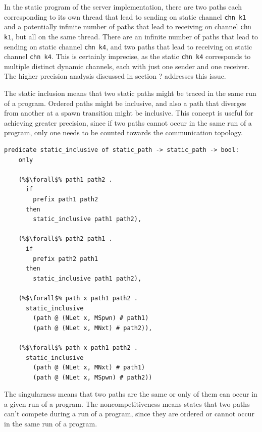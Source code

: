 \documentclass{article}
\begin{document}
In the static program of the server implementation, there are two paths each corresponding to its
own thread that lead
to sending on
static channel \lstinline[language=sugar_lang]{chn k1} and a potentially infinite number of
paths that lead to receiving on
channel \lstinline[language=sugar_lang]{chn k1}, but all on the same thread.
There are an infinite number of paths that lead
to sending on static channel \lstinline[language=sugar_lang]{chn k4}, and two paths
that lead to receiving on static channel
\lstinline[language=sugar_lang]{chn k4}. This is certainly imprecise,
as the static \lstinline[language=sugar_lang]{chn k4} corresponds to
multiple distinct dynamic channels, each with just one sender and one receiver.  The higher
precision analysis discussed in section ? addresses this issue.


The static inclusion means that two static paths might be traced in
the same run of a program. Ordered paths might be inclusive, and also a path that diverges
from another at a spawn transition might be inclusive. This concept is useful for achieving
greater precision, since if two paths cannot occur in the same run of a program, only one needs
to be counted towards the communication topology. 

\begin{lstlisting}[language=logic, escapechar=\%]
  predicate static_inclusive of static_path -> static_path -> bool:
    only

    (%$\forall$% path1 path2 .
      if
        prefix path1 path2
      then
        static_inclusive path1 path2),

    (%$\forall$% path2 path1 .
      if
        prefix path2 path1
      then
        static_inclusive path1 path2),

    (%$\forall$% path x path1 path2 .
      static_inclusive
        (path @ (NLet x, MSpwn) # path1)
        (path @ (NLet x, MNxt) # path2)),

    (%$\forall$% path x path1 path2 .
      static_inclusive
        (path @ (NLet x, MNxt) # path1)
        (path @ (NLet x, MSpwn) # path2))
  \end{lstlisting}


The singularness means that two paths are the same or only of them can occur in a given run of
a program. The noncompetitiveness means states that two paths can't compete during a run of a
program, since they are ordered or cannot occur in the same run of a program.
\end{document}
